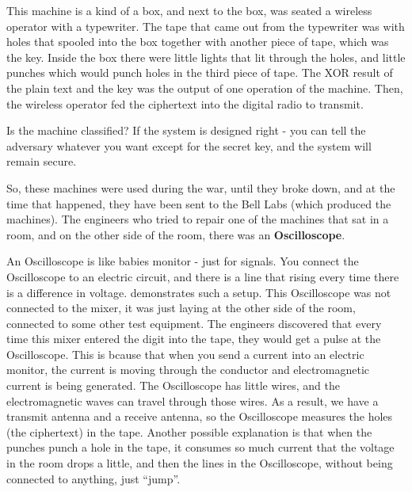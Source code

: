 This machine is a kind of a box, and next to the box, was seated a wireless
operator with a typewriter. The tape that came out from the typewriter was
with holes that spooled into the box together with another piece of tape, which
was the key. Inside the box there were little lights that lit through the holes, and
little punches which would punch holes in the third piece of tape. The XOR result of
the plain text and the key was the output of one operation of the machine. Then, the wireless operator fed the ciphertext into the digital radio to transmit.

Is the machine classified? If the system is designed right - you can tell the
adversary whatever you want except for the secret key, and the system will
remain secure.

So, these machines were used during the war, until they broke down, and at the
time that happened, they have been sent to the Bell Labs (which produced the
machines). The engineers who tried to repair one of the machines that sat in a room,
and on the other side of the room, there was an \textbf{Oscilloscope}. 

An Oscilloscope is like babies monitor - just for signals. You connect the
Oscilloscope to an electric circuit, and there is a line that rising every time
there is a difference in voltage.  demonstrates such a setup.
This Oscilloscope was not connected to the mixer, it was just laying at the other
side of the room, connected to some other test equipment. The engineers
discovered that every time this mixer entered the digit into the tape, they would
get a pulse at the Oscilloscope. This is bcause that when you send a current into an electric monitor, the current is moving through the conductor and electromagnetic current is being generated. The Oscilloscope has little wires, and the electromagnetic
waves can travel through those wires. As a result, we have a transmit antenna and
a receive antenna, so the Oscilloscope measures the holes (the ciphertext) in
the tape. Another possible explanation is that when the punches punch a hole in the
tape, it consumes so much current that the voltage in the room drops a little,
and then the lines in the Oscilloscope, without being connected to anything,
just ``jump''.

